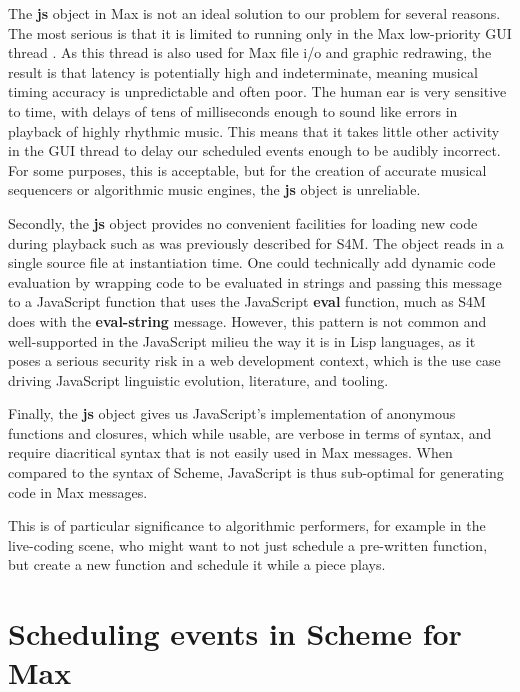 \documentclass[acmsmall]{acmart}
\begin{document}
The \textbf{js} object in Max is not an ideal solution to our problem for several reasons. 
The most serious is that it is limited to running only in the Max low-priority GUI thread \cite{Cycling74}.
As this thread is also used for Max file i/o and graphic redrawing, the result is that latency
is potentially high and indeterminate, meaning musical timing accuracy is unpredictable and often poor.
The human ear is very sensitive to time, with delays of tens of milliseconds enough to sound like errors in playback
of highly rhythmic music. This means that it takes little other activity in the
GUI thread to delay our scheduled events enough to be audibly incorrect. 
For some purposes, this is acceptable, but for the creation of accurate 
musical sequencers or algorithmic music engines, the \textbf{js} object is unreliable. 

Secondly, the \textbf{js} object provides no convenient facilities for loading new code
during playback such as was previously described for S4M.
The object reads in a single source file at instantiation time.
One could technically add dynamic code evaluation by wrapping
code to be evaluated in strings and passing this message to a JavaScript function
that uses the JavaScript \textbf{eval} function, much as S4M does with the
\textbf{eval-string} message. However, this pattern is not common and well-supported
in the JavaScript milieu the way it is in Lisp languages, as it poses a serious security risk in a 
web development context, which is the use case driving JavaScript linguistic
evolution, literature, and tooling.

Finally, the \textbf{js} object gives us JavaScript's implementation of anonymous functions
and closures, which while usable, are verbose in terms of syntax, and require
diacritical syntax that is not easily used in Max messages. When compared to the syntax
of Scheme, JavaScript is thus sub-optimal for generating code in Max messages.

This is of particular significance to algorithmic performers, 
for example in the live-coding scene, who might
want to not just schedule a pre-written function, but create a new function 
and schedule it while a piece plays.


\section{Scheduling events in Scheme for Max}
\end{document}
